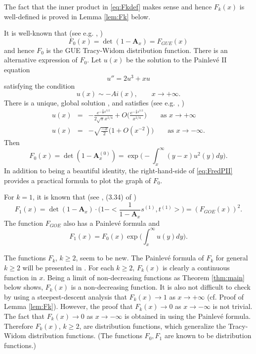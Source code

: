 \documentclass[11pt]{article}
\begin{document}
The fact that the inner product in \eqref{eq:Fkdef} makes sense
and hence $F_k(x)$ is well-defined is proved in Lemma \ref{lem:Fk}
below.

It is well-known that (see e.g. \cite{Forrester},
\cite{TracyWidom})
\begin{equation}\label{eq:TWGUE}
  F_0(x)= \det(1-\mathbf{A}_x)=F_{GUE}(x)
\end{equation}
and hence $F_0$ is the GUE Tracy-Widom distribution function.
There is an alternative expression of $F_0$. Let $u(x)$ be the
solution to the Painlev\'e II equation
\begin{equation}
  u''=2u^3+xu
\end{equation}
satisfying the condition
\begin{equation}
  u(x) \sim -Ai(x), \qquad x\to +\infty.
\end{equation}
There is a unique, global solution \cite{HM}, and satisfies (see
e.g. \cite{HM}, \cite{DZ2})
\begin{eqnarray}
  u(x) &=& -\frac{e^{-\frac23x^{3/2}}}{2\sqrt{\pi}x^{1/4}}
  + O\biggl( \frac{e^{-\frac43x^{3/2}}}{x^{1/4}} \biggr) \qquad \text{as
  $x\to+\infty$} \\
  u(x) &=& -\sqrt{\frac{-x}{2}} \bigl( 1+ O(x^{-2}) \bigr)
  \qquad \text{as $x\to -\infty$}.
\end{eqnarray}
Then \cite{TracyWidom}
\begin{equation}\label{eq:FredPII}
  F_0(x)= \det(1-\mathbf{A}^{(0)}_x) = \exp \biggl( -\int_x^\infty (y-x)
  u^2(y)dy \biggr).
\end{equation}
In addition to being a beautiful identity, the right-hand-side of
\eqref{eq:FredPII} provides a practical formula to plot the graph
of $F_0$.

For $k=1$, it is known that (see \cite{ForresterSamll}, (3.34) of
\cite{BorodinForrester})
\begin{equation}\label{eq:GOEPII}
  F_1(x)= \det(1-\mathbf{A}_x)\cdot
  \biggr( 1- <\frac1{1-\mathbf{A}_x} s^{(1)}, t^{(1)} >\biggr)
  = (F_{GOE}(x))^2 .
\end{equation}
The function $F_{GOE}$ also has a Painlev\'e formula
\cite{TracyWidomGOE} and
\begin{equation}\label{eq:F1PII}
  F_1(x) = F_0(x) \exp\bigg(\int_x^\infty u(y)dy \biggr).
\end{equation}


The functions $F_k$, $k\ge 2$, seem to be new. The Painlev\'e
formula of $F_k$ for general $k\ge 2$ will be presented in
\cite{Baik}. For each $k\ge 2$, $F_k(x)$ is clearly a continuous
function in $x$. Being a limit of non-decreasing functions as
Theorem \ref{thm:main} below shows, $F_k(x)$ is a non-decreasing
function. It is also not difficult to check by using a
steepest-descent analysis that $F_k(x) \to 1$ as $x\to +\infty$
(cf. Proof of Lemma \ref{lem:Fk}). However, the proof that
$F_k(x)\to 0$ as $x\to -\infty$ is not trivial. The fact that
$F_k(x)\to 0$ as $x\to -\infty$ is obtained in \cite{Baik} using
the Painlev\'e formula. Therefore $F_k(x)$, $k\ge 2$, are
distribution functions, which generalize the Tracy-Widom
distribution functions. (The functions $F_0, F_1$ are known to be
distribution functions.)
\end{document}
